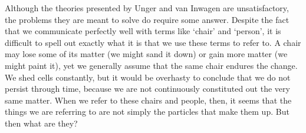 \documentclass[11pt]{article}
\begin{document}
\begin{spacing}{1.5}
Although the theories presented by Unger and van Inwagen are unsatisfactory, the problems they are meant to solve do require some answer. Despite the fact that we communicate perfectly well with terms like `chair' and `person', it is difficult to spell out exactly what it is that we use these terms to refer to. A chair may lose some of its matter (we might sand it down) or gain more matter (we might paint it), yet we generally assume that the same chair endures the change. We shed cells constantly, but it would be overhasty to conclude that we do not persist through time, because we are not continuously constituted out the very same matter. When we refer to these chairs and people, then, it seems that the things we are referring to are not simply the particles that make them up. But then what are they?

\ifstandalone
\end{spacing}


\fi
\end{document}
